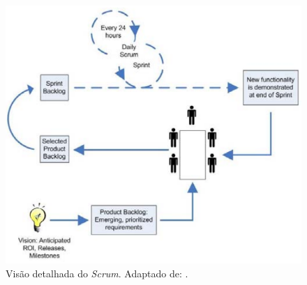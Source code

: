 \begin{figure}[!htb]
	\centering
		\includegraphics[scale=0.7]{figuras/scrum_detalhado}
	\caption{Visão detalhada do \textit{Scrum}. Adaptado de: \cite{scrum2005}.}
	\label{visao_detalhada_scrum}
\end{figure}
\clearpage

